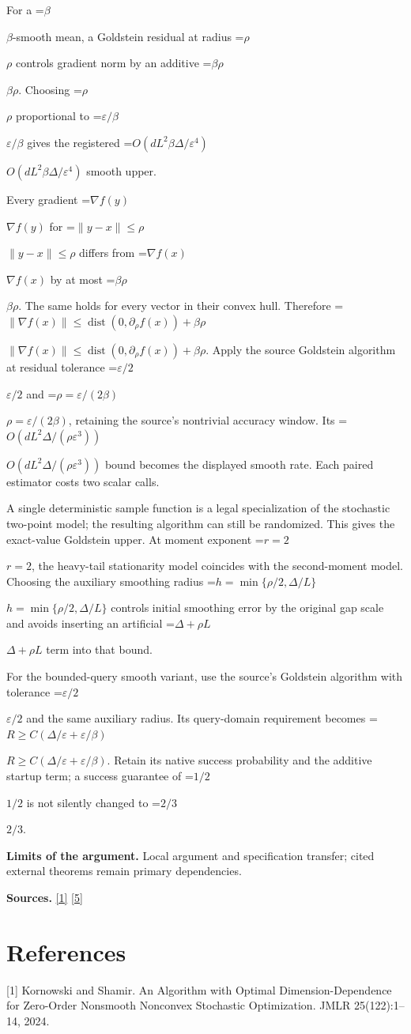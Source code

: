 \documentclass[10pt,a4paper]{article}
\newcommand{\AtlasMath}[1]{\par\begingroup\centering\setbox0=\hbox{$\displaystyle #1$}\ifdim\wd0>1.4\linewidth\typeout{ATLAS WIDE FORMULA: \the\wd0}\fi\ifdim\wd0>\linewidth\resizebox{\linewidth}{!}{\box0}\else\box0\fi\par\endgroup}
\newcommand{\AtlasInlineMath}[1]{\begingroup\setbox0=\hbox{$#1$}\ifdim\wd0>.4\linewidth\endgroup\AtlasMath{#1}\else\endgroup$#1$\fi}
\begin{document}
For a \AtlasInlineMath{\beta}-smooth mean, a Goldstein residual at radius \AtlasInlineMath{\rho} controls gradient norm by an additive \AtlasInlineMath{\beta\rho}. Choosing \AtlasInlineMath{\rho} proportional to \AtlasInlineMath{\varepsilon/\beta} gives the registered \AtlasInlineMath{O(dL^2\beta\Delta/\varepsilon^4)} smooth upper.

Every gradient \AtlasInlineMath{\nabla f(y)} for \AtlasInlineMath{\|y-x\|\le\rho} differs from \AtlasInlineMath{\nabla f(x)} by at most \AtlasInlineMath{\beta\rho}. The same holds for every vector in their convex hull. Therefore \AtlasInlineMath{\|\nabla f(x)\|\le\operatorname{dist}(0,\partial_\rho f(x))+\beta\rho}. Apply the source Goldstein algorithm at residual tolerance \AtlasInlineMath{\varepsilon/2} and \AtlasInlineMath{\rho=\varepsilon/(2\beta)}, retaining the source's nontrivial accuracy window. Its \AtlasInlineMath{O(dL^2\Delta/(\rho\varepsilon^3))} bound becomes the displayed smooth rate. Each paired estimator costs two scalar calls.

A single deterministic sample function is a legal specialization of the stochastic two-point model; the resulting algorithm can still be randomized. This gives the exact-value Goldstein upper. At moment exponent \AtlasInlineMath{r=2}, the heavy-tail stationarity model coincides with the second-moment model. Choosing the auxiliary smoothing radius \AtlasInlineMath{h=\min\{\rho/2,\Delta/L\}} controls initial smoothing error by the original gap scale and avoids inserting an artificial \AtlasInlineMath{\Delta+\rho L} term into that bound.

For the bounded-query smooth variant, use the source's Goldstein algorithm with tolerance \AtlasInlineMath{\varepsilon/2} and the same auxiliary radius. Its query-domain requirement becomes \AtlasInlineMath{R\ge C(\Delta/\varepsilon+\varepsilon/\beta)}. Retain its native success probability and the additive startup term; a success guarantee of \AtlasInlineMath{1/2} is not silently changed to \AtlasInlineMath{2/3}.

\textbf{Limits of the argument.} Local argument and specification transfer; cited external theorems remain primary dependencies.

\textbf{Sources.} \href{https://www.jmlr.org/papers/volume25/23-1159/23-1159.pdf}{[1]} \href{https://arxiv.org/html/2610.00275v2}{[5]}

\section{References}
[1] Kornowski and Shamir. An Algorithm with Optimal Dimension-Dependence for Zero-Order Nonsmooth Nonconvex Stochastic Optimization. JMLR 25(122):1--14, 2024.
\end{document}

